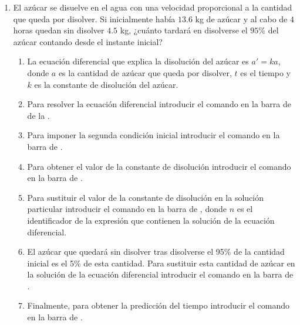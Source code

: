 \begin{enumerate}[leftmargin=*]
\item El azúcar se disuelve en el agua con una velocidad proporcional a la cantidad que queda por disolver.
      Si inicialmente había $13.6$ kg de azúcar y al cabo de $4$ horas quedan sin disolver $4.5$ kg, ¿cuánto tardará en disolverse el $95\%$ del
      azúcar contando desde el instante inicial?
      \begin{indication}
      \begin{enumerate}
      \item La ecuación diferencial que explica la disolución del azúcar es $a'=ka$, donde $a$ es la cantidad de azúcar que queda por disolver, $t$ es el tiempo y $k$ es la constante de disolución del azúcar.
      \item Para resolver la ecuación diferencial introducir el comando  en la barra de  de la .
      \item Para imponer la segunda condición inicial introducir el comando  en la barra de .
      \item Para obtener el valor de la constante de disolución introducir el comando  en la barra de .
      \item Para sustituir el valor de la constante de disolución en la solución particular introducir el comando   en la barra de , donde $n$ es el identificador de la expresión que contienen la solución de la ecuación diferencial.
      \item El azúcar que quedará sin disolver tras disolverse el 95\% de la cantidad inicial es el 5\% de esta cantidad.
            Para sustituir esta cantidad de azúcar en la solución de la ecuación diferencial introducir el comando  en la barra de .
      \item Finalmente, para obtener la predicción del tiempo introducir el comando   en la barra de .
      \end{enumerate}
      \end{indication}

\end{enumerate}


